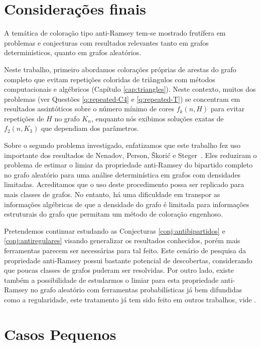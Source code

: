 \documentclass[12pt,a4paper]{book}
\begin{document}
\chapter[Considerações finais]{Considerações finais}
\label{cap:conclusao}

A temática de coloração tipo anti-Ramsey tem-se mostrado frutífera em  problemas e conjecturas
com resultados relevantes tanto em grafos determinísticos, quanto em grafos aleatórios. 

Neste trabalho, primeiro abordamos colorações próprias de arestas do grafo completo que evitam repetições coloridas de triângulos com métodos computacionais e algébricos (Capítulo \ref{cap:triangles}).
Neste contexto, muitos dos problemas (ver Questões \ref{q:repeated-C4} e \ref{q:repeated-T}) se concentram em resultados assintóticos sobre o número mínimo de cores $f_k(n,H)$ para evitar repetições de $H$ no grafo $K_n$, enquanto nós exibimos soluções exatas de $f_2(n,K_3)$ que dependiam dos parâmetros.


Sobre o segundo problema investigado, enfatizamos que este trabalho fez uso importante dos resultados de Nenadov,
Person, Škorić e Steger~\cite{NePeSkSt14}. 
Eles reduziram o problema de estimar o limiar da propriedade anti-Ramsey do bipartido completo no grafo aleatório para uma análise determinística em grafos com densidades limitadas. 
Acreditamos que o uso deste procedimento possa ser replicado para mais classes de grafos. 
No entanto, há uma dificuldade em transpor as informações algébricas de que a densidade do grafo é limitada para informações estruturais do grafo que permitam um método de coloração engenhoso.

Pretendemos continuar estudando as Conjecturas \ref{conj:antibipartidos} e \ref{conj:antiregulares} visando generalizar os resultados conhecidos, porém mais ferramentas parecem ser necessárias para tal feito. 
Este cenário de pesquisa da propriedade anti-Ramsey possui bastante potencial de descobertas, considerando que poucas classes de grafos puderam ser resolvidas.
Por outro lado, existe também a possibilidade de estudarmos o limiar para esta propriedade anti-Ramsey no grafo aleatório com ferramentas probabilísticas já bem difundidas como a regularidade, este tratamento já tem sido feito em outros trabalhos, vide \cite{KoKoMo12,araujo2022anti, aigner2022large}.

\appendix
\chapter{Casos Pequenos}\label{cap:app}
\end{document}

